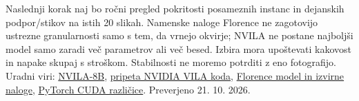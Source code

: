\documentclass[10pt,a4paper]{article}
\begin{document}
Naslednji korak naj bo ročni pregled pokritosti posameznih instanc in dejanskih podpor/stikov na istih 20 slikah. Namenske naloge Florence ne zagotovijo ustrezne granularnosti samo s tem, da vrnejo okvirje; NVILA ne postane najboljši model samo zaradi več parametrov ali več besed. Izbira mora upoštevati kakovost in napake skupaj s stroškom. Stabilnosti ne moremo potrditi z eno fotografijo.
\vfill{\footnotesize Uradni viri: \href{https://huggingface.co/Efficient-Large-Model/NVILA-8B}{NVILA-8B}, \href{https://github.com/NVlabs/VILA/tree/57ecbfb904b99b563db69ef7916f6390eecea516}{pripeta NVIDIA VILA koda}, \href{https://huggingface.co/microsoft/Florence-2-large}{Florence model in izvirne naloge}, \href{https://pytorch.org/get-started/previous-versions/}{PyTorch CUDA različice}. Preverjeno 21. 10. 2026.}
\end{document}
